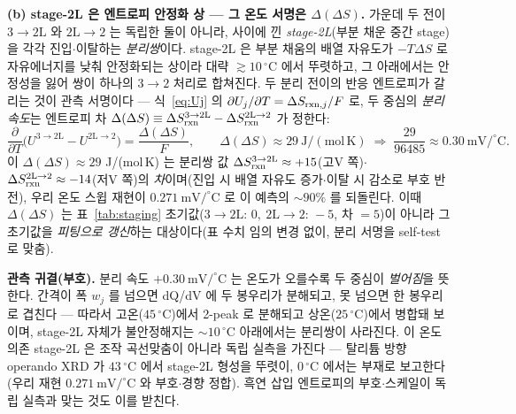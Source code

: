\textbf{(b) stage-2L 은 엔트로피 안정화 상 --- 그 온도 서명은 $\Delta(\Delta S)$.} 가운데 두 전이
$3\!\to\!2\mathrm L$ 와 $2\mathrm L\!\to\!2$ 는 독립한 둘이 아니라, 사이에 낀 \emph{stage-2L}(부분 채운 중간 stage)을
각각 진입$\cdot$이탈하는 \emph{분리쌍}이다. stage-2L 은 부분 채움의 배열 자유도가 $-T\Delta S$ 로 자유에너지를
낮춰 안정화되는 상이라 대략 $\gtrsim10\,^\circ$C 에서 뚜렷하고, 그 아래에서는 안정성을 잃어 쌍이 하나의
$3\!\to\!2$ 처리로 합쳐진다. 두 분리 전이의 반응 엔트로피가 갈리는 것이 관측 서명이다 --- 식~\eqref{eq:Uj} 의
$\partial U_j/\partial T=\Delta S_{\mathrm{rxn},j}/F$ 로, 두 중심의 \emph{분리 속도}는 엔트로피 차
$\Delta(\Delta S)\equiv\Delta S_{\mathrm{rxn}}^{3\to2\mathrm L}-\Delta S_{\mathrm{rxn}}^{2\mathrm L\to2}$ 가 정한다:
\begin{equation}
\frac{\partial}{\partial T}\big(U^{3\to2\mathrm L}-U^{2\mathrm L\to2}\big)
=\frac{\Delta(\Delta S)}{F},
\qquad \Delta(\Delta S)\approx29\ \mathrm{J/(mol\,K)}
\;\Rightarrow\;
\frac{29}{96485}\approx0.30\ \mathrm{mV/^\circ C}.
\label{eq:gr2l-split}
\end{equation}
이 $\Delta(\Delta S)\approx29$ J/(mol\,K) 는 분리쌍 값 $\Delta S_{\mathrm{rxn}}^{3\to2\mathrm L}\approx+15$(고V 쪽)$\cdot$
$\Delta S_{\mathrm{rxn}}^{2\mathrm L\to2}\approx-14$(저V 쪽)의 \emph{차}이며(진입 시 배열 자유도 증가$\cdot$이탈 시 감소로
부호 반전), 우리 온도 스윕 재현이 $0.271\ \mathrm{mV/^\circ C}$ 로 이 예측의 $\sim90\%$ 를 되돌린다. 이때
$\Delta(\Delta S)$ 는 표~\ref{tab:staging} 초기값($3\!\to\!2\mathrm L{:}\,0,\ 2\mathrm L\!\to\!2{:}\,-5$, 차 $=5$)이
아니라 그 초기값을 \emph{피팅으로 갱신}하는 대상이다(표 수치 임의 변경 없이, 분리 서명을 self-test 로 맞춤).

\begin{signbox}
\textbf{관측 귀결(부호).} 분리 속도 $+0.30\ \mathrm{mV/^\circ C}$ 는 온도가 오를수록 두 중심이 \emph{벌어짐}을
뜻한다. 간격이 폭 $w_j$ 를 넘으면 dQ/dV 에 두 봉우리가 분해되고, 못 넘으면 한 봉우리로 겹친다 --- 따라서
고온($45\,^\circ$C)에서 2-peak 로 분해되고 상온($25\,^\circ$C)에서 병합돼 보이며, stage-2L 자체가 불안정해지는
$\sim10\,^\circ$C 아래에서는 분리쌍이 사라진다. 이 온도 의존 stage-2L 은 조작 곡선맞춤이 아니라 독립 실측을
가진다 --- 탈리튬 방향 operando XRD 가 $43\,^\circ$C 에서 stage-2L 형성을 뚜렷이, $0\,^\circ$C 에서는 부재로
보고한다\cite{schmitt2022}(우리 재현 $0.271\ \mathrm{mV/^\circ C}$ 와 부호$\cdot$경향 정합). 흑연 삽입
엔트로피의 부호$\cdot$스케일이 독립 실측과 맞는 것도 이를 받친다\cite{reynier2003}.
\end{signbox}

